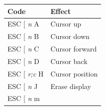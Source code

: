 \documentclass{article}
\begin{document}
\begin{longtable}[]{@{}ll@{}}
\toprule
\begin{minipage}[b]{0.34\columnwidth}\raggedright
Code
\end{minipage} & \begin{minipage}[b]{0.60\columnwidth}\raggedright
Effect
\end{minipage}\tabularnewline
\midrule
\endhead
\begin{minipage}[t]{0.34\columnwidth}\raggedright
ESC {[} \emph{n} A
\end{minipage} & \begin{minipage}[t]{0.60\columnwidth}\raggedright
Cursor up
\end{minipage}\tabularnewline
\begin{minipage}[t]{0.34\columnwidth}\raggedright
ESC {[} \emph{n} B
\end{minipage} & \begin{minipage}[t]{0.60\columnwidth}\raggedright
Cursor down
\end{minipage}\tabularnewline
\begin{minipage}[t]{0.34\columnwidth}\raggedright
ESC {[} \emph{n} C
\end{minipage} & \begin{minipage}[t]{0.60\columnwidth}\raggedright
Cursor forward
\end{minipage}\tabularnewline
\begin{minipage}[t]{0.34\columnwidth}\raggedright
ESC {[} \emph{n} D
\end{minipage} & \begin{minipage}[t]{0.60\columnwidth}\raggedright
Cursor back
\end{minipage}\tabularnewline
\begin{minipage}[t]{0.34\columnwidth}\raggedright
ESC {[} \emph{r;c} H
\end{minipage} & \begin{minipage}[t]{0.60\columnwidth}\raggedright
Cursor position
\end{minipage}\tabularnewline
\begin{minipage}[t]{0.34\columnwidth}\raggedright
ESC {[} \emph{n} J
\end{minipage} & \begin{minipage}[t]{0.60\columnwidth}\raggedright
Erase display
\end{minipage}\tabularnewline
\begin{minipage}[t]{0.34\columnwidth}\raggedright
ESC {[} \emph{n} m
\end{minipage} & \begin{minipage}[t]{0.60\columnwidth}\raggedright

\end{minipage}
\end{longtable}
\end{document}
